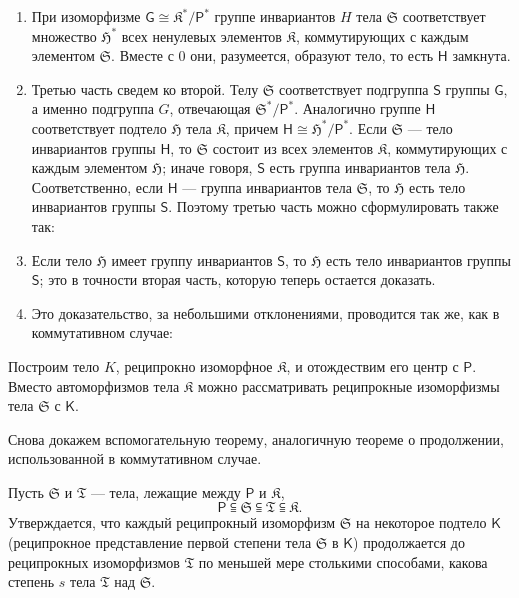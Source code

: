 \documentclass[11pt]{article}
\begin{document}
\begin{enumerate}
\item При изоморфизме \(\mathsf{G}\cong\mathfrak K^*/\mathsf P^*\) группе инвариантов \(H\) тела \(\mathfrak S\) соответствует множество \(\mathfrak H^*\) всех ненулевых элементов \(\mathfrak K\), коммутирующих с каждым элементом \(\mathfrak S\). Вместе с 0 они, разумеется, образуют тело, то есть \(\mathsf{H}\) замкнута.

\item Третью часть сведем ко второй. Телу \(\mathfrak S\) соответствует подгруппа \(\mathsf{S}\) группы \(\mathsf{G}\), а именно подгруппа \(G\), отвечающая \(\mathfrak S^*/\mathsf P^*\). Аналогично группе \(\mathsf{H}\) соответствует подтело \(\mathfrak H\) тела \(\mathfrak K\), причем \(\mathsf{H}\cong \mathfrak H^*/\mathsf P^*\). Если \(\mathfrak S\) --- тело инвариантов группы \(\mathsf{H}\), то \(\mathfrak S\) состоит из всех элементов \(\mathfrak K\), коммутирующих с каждым элементом \(\mathfrak H\); иначе говоря, \(\mathsf{S}\) есть группа инвариантов тела \(\mathfrak H\). Соответственно, если \(\mathsf{H}\) --- группа инвариантов тела \(\mathfrak S\), то \(\mathfrak H\) есть тело инвариантов группы \(\mathsf{S}\). Поэтому третью часть можно сформулировать также так:

\item[\(3'\).] Если тело \(\mathfrak H\) имеет группу инвариантов \(\mathsf{S}\), то \(\mathfrak H\) есть тело инвариантов группы \(\mathsf{S}\); это в точности вторая часть, которую теперь остается доказать.

\item[3.] Это доказательство, за небольшими отклонениями, проводится так же, как в коммутативном случае:
\end{enumerate}

Построим тело \(K\), реципрокно изоморфное \(\mathfrak K\), и отождествим его центр с \(\mathsf P\). Вместо автоморфизмов тела \(\mathfrak K\) можно рассматривать реципрокные изоморфизмы тела \(\mathfrak S\) с \(\mathsf{K}\).

Снова докажем вспомогательную теорему, аналогичную теореме о продолжении, использованной в коммутативном случае.

Пусть \(\mathfrak S\) и \(\mathfrak T\) --- тела, лежащие между \(\mathsf P\) и \(\mathfrak K\),
\[
\mathsf P \subseteqq \mathfrak S \subseteqq \mathfrak T \subseteqq \mathfrak K.
\]
Утверждается, что каждый реципрокный изоморфизм \(\mathfrak S\) на некоторое подтело \(\mathsf{K}\) (реципрокное представление первой степени тела \(\mathfrak S\) в \(\mathsf{K}\)) продолжается до реципрокных изоморфизмов \(\mathfrak T\) по меньшей мере столькими способами, какова степень \(s\) тела \(\mathfrak T\) над \(\mathfrak S\).
\end{document}
